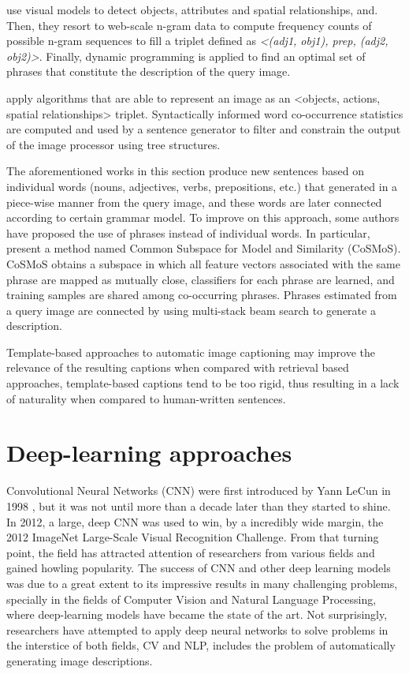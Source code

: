 \citet{Li2011} use visual models to detect objects, attributes and spatial relationships, and. Then, they resort to web-scale n-gram data to compute frequency counts of possible n-gram sequences to fill a triplet defined as \textit{<(adj1, obj1), prep, (adj2, obj2)>}. Finally, dynamic programming is applied to find an optimal set of phrases that constitute the description of the query image.

\citet{Mitchell2012} apply algorithms that are able to represent an image as an <objects, actions, spatial relationships> triplet. Syntactically informed word co-occurrence statistics are computed and used by a sentence generator to filter and constrain the output of the image processor using tree structures.

The aforementioned works in this section produce new sentences based on individual words (nouns, adjectives, verbs, prepositions, etc.) that generated in a piece-wise manner from the query image, and these words are later connected according to certain grammar model. To improve on this approach, some authors have proposed the use of phrases instead of individual words. In particular, \citet{Ushiku2015} present a method named Common Subspace for Model and Similarity (CoSMoS). CoSMoS obtains a subspace in which all feature vectors associated with the same phrase are mapped as mutually close, classifiers for each phrase are learned, and training samples are shared among co-occurring phrases. Phrases estimated from a query image are connected by using multi-stack beam search to generate a description.

Template-based approaches to automatic image captioning may improve the relevance of the resulting captions when compared with retrieval based approaches, template-based captions tend to be too rigid, thus resulting in a lack of naturality when compared to human-written sentences.

\section{Deep-learning approaches}

Convolutional Neural Networks (CNN) were first introduced by Yann LeCun in 1998 \citep{Lecun1998}, but it was not until more than a decade later than they started to shine. In 2012, a large, deep CNN \citep{Krizhevsky2012} was used to win, by a incredibly wide margin, the 2012 ImageNet Large-Scale Visual Recognition Challenge. From that turning point, the field has attracted attention of researchers from various fields and gained howling popularity. The success of CNN and other deep learning models was due to a great extent to its impressive results in many challenging problems, specially in the fields of Computer Vision and Natural Language Processing, where deep-learning models have became the state of the art. Not surprisingly, researchers have attempted to apply deep neural networks to solve problems in the interstice of both fields, CV and NLP, includes the problem of automatically generating image descriptions.

